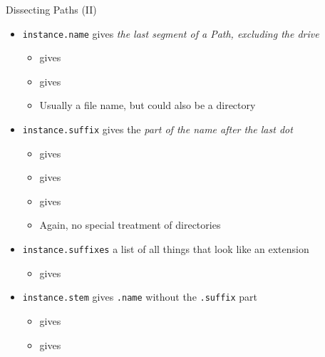 \begin{frame}{Dissecting Paths (II)}
%
\begin{itemize}
\item \texttt{instance.name} gives \emph{the last segment of a Path, excluding the drive}
	\begin{itemize}
	\item {} gives 
	\item {} gives 
	\item Usually a file name, but could also be a directory
	\end{itemize}
\item \texttt{instance.suffix} gives the \emph{part of the name after the last dot}
	\begin{itemize}
	\item {} gives 
	\item {} gives 
	\item {} gives 
	\item Again, no special treatment of directories
	\end{itemize}
\item \texttt{instance.suffixes} a list of all things that look like an extension
	\begin{itemize}
	\item {} gives \inPy{['tar', 'gz']}
	\end{itemize}
\item \texttt{instance.stem} gives \texttt{.name} without the \texttt{.suffix} part
	\begin{itemize}
	\item {} gives 
	\item {} gives 
	\end{itemize}
\end{itemize}
%
\end{frame}


